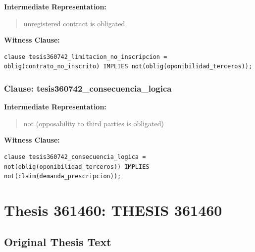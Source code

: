 \documentclass[11pt,a4paper]{article}
\begin{document}
\textbf{Intermediate Representation:}

\begin{quote}
unregistered contract is obligated
\end{quote}

\textbf{Witness Clause:}

\begin{lstlisting}[style=witnessstyle, language=Witness]
clause tesis360742_limitacion_no_inscripcion = oblig(contrato_no_inscrito) IMPLIES not(oblig(oponibilidad_terceros));
\end{lstlisting}

\subsubsection{Clause: tesis360742\_consecuencia\_logica}

\textbf{Intermediate Representation:}

\begin{quote}
not (opposability to third parties is obligated)
\end{quote}

\textbf{Witness Clause:}

\begin{lstlisting}[style=witnessstyle, language=Witness]
clause tesis360742_consecuencia_logica = not(oblig(oponibilidad_terceros)) IMPLIES not(claim(demanda_prescripcion));
\end{lstlisting}

\newpage

\section{Thesis 361460: THESIS 361460}
\label{thesis:361460}

\subsection{Original Thesis Text}
\end{document}
